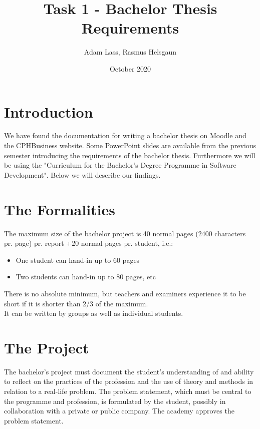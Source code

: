 \documentclass[12pt]{article}
\title{Task 1 - Bachelor Thesis Requirements}
\author{Adam Lass, Rasmus Helsgaun}
\date{October 2020}
\begin{document}
\clearpage\maketitle
\thispagestyle{empty}

\pagebreak
\tableofcontents

\pagebreak
\section{Introduction}

We have found the documentation for writing a bachelor thesis on Moodle and the CPHBusiness website. Some PowerPoint slides are available from the previous semester introducing the requirements of the bachelor thesis\cite{bachelorslides}. Furthermore we will be using the "Curriculum for the Bachelor’s Degree Programme in Software Development"\cite{curriculum}. Below we will describe our findings.

\section{The Formalities}

The maximum size of the bachelor project is 40 normal pages 
(2400 characters pr. page) pr. report +20 normal pages pr. student, i.e.:

\begin{itemize}
\item One student can hand-in up to 60 pages
\item Two students can hand-in up to 80 pages, etc
\end{itemize}

There is no absolute minimum, but teachers and
examiners experience it to be short if it is shorter
than 2/3 of the maximum.
\\
It can be written by groups as well as individual
students. 

\section{The Project}

The bachelor’s project must document the student’s understanding of and ability to reflect on the practices of the profession and the use of theory and methods in relation to a real-life problem. The problem statement, which must be central to the programme and profession, is formulated by the student, possibly in collaboration with a private or public company. The academy approves the problem statement.
\end{document}
